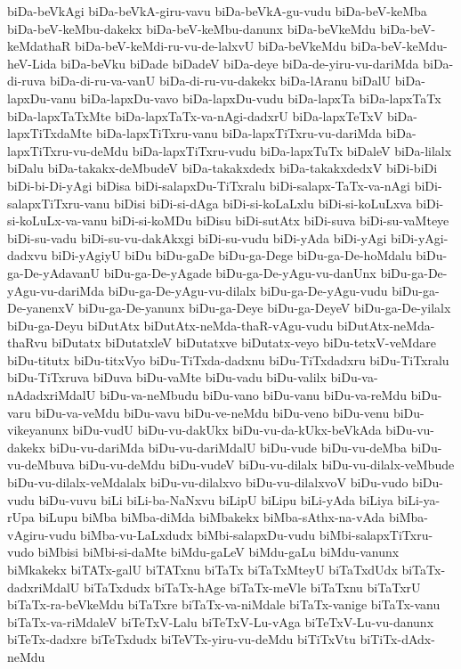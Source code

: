 {biDa-beVkAgi
biDa-beVkA-giru-vavu
biDa-beVkA-gu-vudu
biDa-beV-keMba
biDa-beV-keMbu-dakekx
biDa-beV-keMbu-danunx
biDa-beVkeMdu
biDa-beV-keMdathaR
biDa-beV-keMdi-ru-vu-de-lalxvU
biDa-beVkeMdu
biDa-beV-keMdu-heV-Lida
biDa-beVku
biDade
biDadeV
biDa-deye
biDa-de-yiru-vu-dariMda
biDa-di-ruva
biDa-di-ru-va-vanU
biDa-di-ru-vu-dakekx
biDa-lAranu
biDalU
biDa-lapxDu-vanu
biDa-lapxDu-vavo
biDa-lapxDu-vudu
biDa-lapxTa
biDa-lapxTaTx
biDa-lapxTaTxMte
biDa-lapxTaTx-va-nAgi-dadxrU
biDa-lapxTeTxV
biDa-lapxTiTxdaMte
biDa-lapxTiTxru-vanu
biDa-lapxTiTxru-vu-dariMda
biDa-lapxTiTxru-vu-deMdu
biDa-lapxTiTxru-vudu
biDa-lapxTuTx
biDaleV
biDa-lilalx
biDalu
biDa-takakx-deMbudeV
biDa-takakxdedx
biDa-takakxdedxV
biDi-biDi
biDi-bi-Di-yAgi
biDisa
biDi-salapxDu-TiTxralu
biDi-salapx-TaTx-va-nAgi
biDi-salapxTiTxru-vanu
biDisi
biDi-si-dAga
biDi-si-koLaLxlu
biDi-si-koLuLxva
biDi-si-koLuLx-va-vanu
biDi-si-koMDu
biDisu
biDi-sutAtx
biDi-suva
biDi-su-vaMteye
biDi-su-vadu
biDi-su-vu-dakAkxgi
biDi-su-vudu
biDi-yAda
biDi-yAgi
biDi-yAgi-dadxvu
biDi-yAgiyU
biDu
biDu-gaDe
biDu-ga-Dege
biDu-ga-De-hoMdalu
biDu-ga-De-yAdavanU
biDu-ga-De-yAgade
biDu-ga-De-yAgu-vu-danUnx
biDu-ga-De-yAgu-vu-dariMda
biDu-ga-De-yAgu-vu-dilalx
biDu-ga-De-yAgu-vudu
biDu-ga-De-yanenxV
biDu-ga-De-yanunx
biDu-ga-Deye
biDu-ga-DeyeV
biDu-ga-De-yilalx
biDu-ga-Deyu
biDutAtx
biDutAtx-neMda-thaR-vAgu-vudu
biDutAtx-neMda-thaRvu
biDutatx
biDutatxleV
biDutatxve
biDutatx-veyo
biDu-tetxV-veMdare
biDu-titutx
biDu-titxVyo
biDu-TiTxda-dadxnu
biDu-TiTxdadxru
biDu-TiTxralu
biDu-TiTxruva
biDuva
biDu-vaMte
biDu-vadu
biDu-valilx
biDu-va-nAdadxriMdalU
biDu-va-neMbudu
biDu-vano
biDu-vanu
biDu-va-reMdu
biDu-varu
biDu-va-veMdu
biDu-vavu
biDu-ve-neMdu
biDu-veno
biDu-venu
biDu-vikeyanunx
biDu-vudU
biDu-vu-dakUkx
biDu-vu-da-kUkx-beVkAda
biDu-vu-dakekx
biDu-vu-dariMda
biDu-vu-dariMdalU
biDu-vude
biDu-vu-deMba
biDu-vu-deMbuva
biDu-vu-deMdu
biDu-vudeV
biDu-vu-dilalx
biDu-vu-dilalx-veMbude
biDu-vu-dilalx-veMdalalx
biDu-vu-dilalxvo
biDu-vu-dilalxvoV
biDu-vudo
biDu-vudu
biDu-vuvu
biLi
biLi-ba-NaNxvu
biLipU
biLipu
biLi-yAda
biLiya
biLi-ya-rUpa
biLupu
biMba
biMba-diMda
biMbakekx
biMba-sAthx-na-vAda
biMba-vAgiru-vudu
biMba-vu-LaLxdudx
biMbi-salapxDu-vudu
biMbi-salapxTiTxru-vudo
biMbisi
biMbi-si-daMte
biMdu-gaLeV
biMdu-gaLu
biMdu-vanunx
biMkakekx
biTATx-galU
biTATxnu
biTaTx
biTaTxMteyU
biTaTxdUdx
biTaTx-dadxriMdalU
biTaTxdudx
biTaTx-hAge
biTaTx-meVle
biTaTxnu
biTaTxrU
biTaTx-ra-beVkeMdu
biTaTxre
biTaTx-va-niMdale
biTaTx-vanige
biTaTx-vanu
biTaTx-va-riMdaleV
biTeTxV-Lalu
biTeTxV-Lu-vAga
biTeTxV-Lu-vu-danunx
biTeTx-dadxre
biTeTxdudx
biTeVTx-yiru-vu-deMdu
biTiTxVtu
biTiTx-dAdx-neMdu
}
